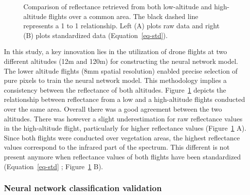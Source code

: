 \documentclass[
  number]{elsarticle}
\begin{document}
\label{cell-fig-CompareRef}
\begin{figure}[H]


\caption{\label{fig-CompareRef}Comparison of reflectance retrieved from
both low-altitude and high-altitude flights over a common area. The
black dashed line represents a 1 to 1 relationship. Left (A) plots raw
data and right (B) plots standardized data (Equation~\ref{eq-std}).}

\end{figure}%

In this study, a key innovation lies in the utilization of drone flights
at two different altitudes (12m and 120m) for constructing the neural
network model. The lower altitude flights (8mm spatial resolution)
enabled precise selection of pure pixels to train the neural network
model. This methodology implies a consistency between the reflectance of
both altitudes. Figure~\ref{fig-CompareRef} depicts the relationship
between reflectance from a low and a high-altitude flights conducted
over the same area. Overall there was a good agreement between the two
altitudes. There was however a slight underestimation for raw
reflectance values in the high-altitude flight, particularly for higher
reflectance values (Figure~\ref{fig-CompareRef} A). Since both flights
were conducted over vegetation areas, the highest reflectance values
correspond to the infrared part of the spectrum. This different is not
present anymore when reflectance values of both flights have been
standardized (Equation~\ref{eq-std} ; Figure~\ref{fig-CompareRef} B).

\subsubsection{Neural network classification
validation}\label{neural-network-classification-validation}
\end{document}
